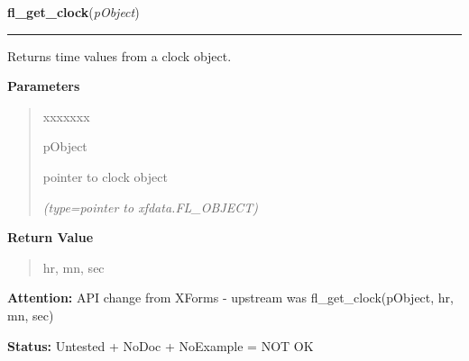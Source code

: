     \label{xformslib:library:fl_get_clock}

    \vspace{0.5ex}

\hspace{.8\funcindent}\begin{boxedminipage}{\funcwidth}

    \raggedright \textbf{fl\_get\_clock}(\textit{pObject})

    \vspace{-1.5ex}

    \rule{\textwidth}{0.5\fboxrule}
\setlength{\parskip}{2ex}
    Returns time values from a clock object.

\setlength{\parskip}{1ex}
      \textbf{Parameters}
      \vspace{-1ex}

      \begin{quote}
        \begin{Ventry}{xxxxxxx}

          \item[pObject]

          pointer to clock object

            {\it (type=pointer to xfdata.FL\_OBJECT)}

        \end{Ventry}

      \end{quote}

      \textbf{Return Value}
    \vspace{-1ex}

      \begin{quote}
      hr, mn, sec

      \end{quote}

\textbf{Attention:} API change from XForms - upstream was fl\_get\_clock(pObject, hr, mn, sec)



\textbf{Status:} Untested + NoDoc + NoExample = NOT OK



    \end{boxedminipage}

    \label{xformslib:library:fl_set_clock_adjustment}

